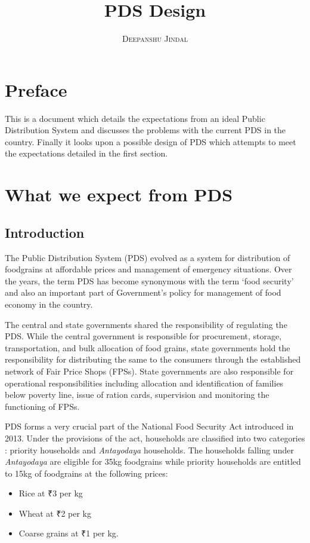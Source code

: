 \documentclass[a4paper,12pt,openany]{book}
\title{\Huge \textbf{PDS Design}}\\
\author{\textsc{Deepanshu Jindal}}\\
\begin{document}
\frontmatter
\maketitle

\tableofcontents
\mainmatter

\chapter*{Preface}
This is a document which details the expectations from an ideal Public Distribution System and discusses the problems with the current PDS in the country. Finally it looks upon a possible design of PDS which attempts to meet the expectations detailed in the first section.
\\


\chapter{What we expect from PDS}

\section{Introduction}
The Public Distribution System (PDS) \cite{PDS} evolved as a system for distribution of foodgrains at affordable prices and management of emergency situations. Over the years, the term PDS  has become synonymous with the term ‘food security’ and also an important part of Government’s policy for management of food economy in the country.

The central and state governments shared the responsibility of regulating the PDS. While the central government is responsible for procurement, storage, transportation, and bulk allocation of food grains, state governments hold the responsibility for distributing the same to the consumers through the established network of Fair Price Shops (FPSs). State governments are also responsible for operational responsibilities including allocation and identification of families below poverty line, issue of ration cards, supervision and monitoring the functioning of FPSs.

PDS forms a very crucial part of the National Food Security Act \cite{NFSA} introduced in 2013. Under the provisions of the act, households are classified into two categories : priority households and \emph{Antayodaya} households. The households falling under \emph{Antayodaya} are eligible for 35kg foodgrains while priority households are entitled to 15kg of foodgrains at the following prices:
\begin{itemize}
 \item Rice at ₹3 per kg \vspace{-3pt}
 \item Wheat at ₹2 per kg \vspace{-3pt}
 \item Coarse grains at ₹1 per kg. 
\end{itemize}
   
\end{document}
